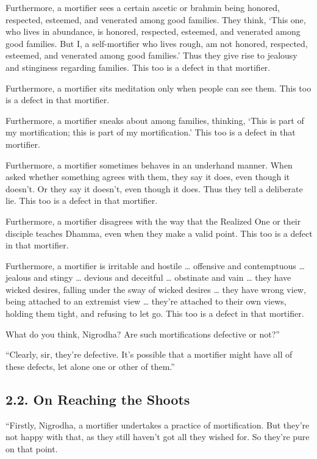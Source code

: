 \documentclass[12pt,openany]{book}%
\begin{document}
Furthermore, a mortifier sees a certain ascetic or brahmin being honored, respected, esteemed, and venerated among good families. They think, ‘This one, who lives in abundance, is honored, respected, esteemed, and venerated among good families. But I, a self-mortifier who lives rough, am not honored, respected, esteemed, and venerated among good families.’ Thus they give rise to jealousy and stinginess regarding families. This too is a defect in that mortifier. 

Furthermore, a mortifier sits meditation only when people can see them. This too is a defect in that mortifier. 

Furthermore, a mortifier sneaks about among families, thinking, ‘This is part of my mortification; this is part of my mortification.’ This too is a defect in that mortifier. 

Furthermore, a mortifier sometimes behaves in an underhand manner. When asked whether something agrees with them, they say it does, even though it doesn’t. Or they say it doesn’t, even though it does. Thus they tell a deliberate lie. This too is a defect in that mortifier. 

Furthermore, a mortifier disagrees with the way that the Realized One or their disciple teaches Dhamma, even when they make a valid point. This too is a defect in that mortifier. 

Furthermore, a mortifier is irritable and hostile … offensive and contemptuous … jealous and stingy … devious and deceitful … obstinate and vain … they have wicked desires, falling under the sway of wicked desires … they have wrong view, being attached to an extremist view … they’re attached to their own views, holding them tight, and refusing to let go. This too is a defect in that mortifier. 

What do you think, Nigrodha? Are such mortifications defective or not?” 

“Clearly, sir, they’re defective. It’s possible that a mortifier might have all of these defects, let alone one or other of them.” 

\subsection*{2.2. On Reaching the Shoots }

“Firstly, Nigrodha, a mortifier undertakes a practice of mortification. But they’re not happy with that, as they still haven’t got all they wished for. So they’re pure on that point. 
\end{document}
